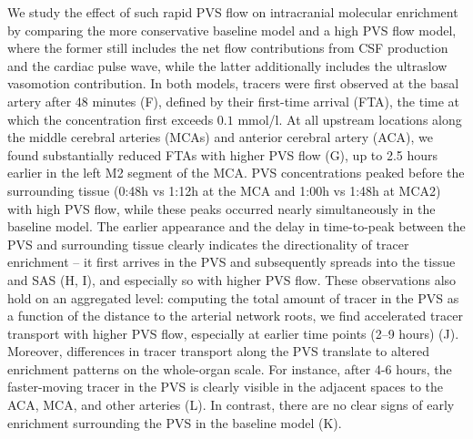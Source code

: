 \documentclass[fleqn,10pt]{wlscirep}
\begin{document}
We study the effect of such rapid PVS flow on intracranial molecular
enrichment by comparing the more conservative baseline model and a
high PVS flow model, where the former still includes the net flow
contributions from CSF production and the cardiac pulse wave, while
the latter additionally includes the ultraslow vasomotion
contribution. In both models, tracers were first observed at the basal
artery after 48 minutes (F), defined by their first-time
arrival (FTA), the time at which the concentration first exceeds $0.1$
mmol/l. At all upstream locations along the middle cerebral arteries
(MCAs) and anterior cerebral artery (ACA), we found substantially
reduced FTAs with higher PVS flow (G), up to 2.5 hours
earlier in the left M2 segment of the MCA. PVS concentrations peaked
before the surrounding tissue (0:48h vs 1:12h at the MCA and 1:00h vs
1:48h at MCA2) with high PVS flow, while these peaks occurred nearly
simultaneously in the baseline model. The earlier appearance and the
delay in time-to-peak between the PVS and surrounding tissue clearly
indicates the directionality of tracer enrichment -- it first arrives
in the PVS and subsequently spreads into the tissue and SAS
(H, I), and especially so with higher PVS flow. These
observations also hold on an aggregated level: computing the total
amount of tracer in the PVS as a function of the distance to the
arterial network roots, we find accelerated tracer transport with
higher PVS flow, especially at earlier time points (2--9 hours)
(J). Moreover, differences in tracer transport along the
PVS translate to altered enrichment patterns on the whole-organ
scale. For instance, after 4-6 hours, the faster-moving tracer in the
PVS is clearly visible in the adjacent spaces to the ACA, MCA, and
other arteries (L). In contrast, there are no clear
signs of early enrichment surrounding the PVS in the baseline model
(K).
\end{document}
